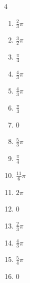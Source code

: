 \begin{multicols}{4}
\begin{enumerate}
\columnbreak %

  \item $\displaystyle \frac{2}{3}\pi$

  \item $\displaystyle \frac{3}{2}\pi$

  \item $\displaystyle \frac{\pi}{4}$

  \item $\displaystyle \frac{4}{3}\pi$

  \item $\displaystyle \frac{4}{3}\pi$

  \item $\displaystyle \frac{\pi}{3}$

  \item $\displaystyle 0$

  \item $\displaystyle \frac{5}{3}\pi$

  \item $\displaystyle \frac{\pi}{4}$

  \item $\displaystyle \frac{11}{6}\pi$

  \item $\displaystyle 2\pi$

  \item $\displaystyle 0$

  \item $\displaystyle \frac{2}{3}\pi$

  \item $\displaystyle \frac{4}{3}\pi$

  \item $\displaystyle \frac{5}{4}\pi$

  \item $\displaystyle 0$


\end{enumerate}
\end{multicols}
